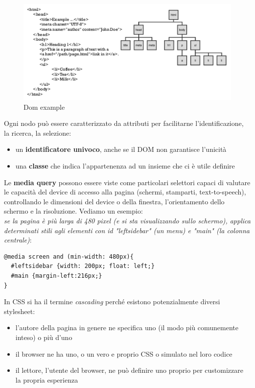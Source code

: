 \documentclass[a4paper,12pt, oneside]{book}
\begin{document}
\begin{figure}
    \caption{Dom example}
    \label{dom:example}
	\includegraphics[scale=0.9]{img/dom.png}
\end{figure}
Ogni nodo può essere caratterizzato da attributi per facilitarne l'identificazione, la ricerca, la selezione:
\begin{itemize}
	\item un \textbf{identificatore univoco}, anche se il DOM non garantisce l'unicità
	\item una \textbf{classe} che indica l'appartenenza ad un insieme che ci è utile definire
\end{itemize}
Le \textbf{media query} possono essere viste come particolari selettori capaci di valutare le capacità
del device di accesso alla pagina (schermi, stamparti, text-to-speech), controllando le dimensioni
del device o della finestra, l'orientamento dello schermo e la risoluzione.
Vediamo un esempio:\\
\textit{se la pagina è più larga di 480
	pixel (e si sta visualizzando sullo schermo), applica
	determinati stili agli elementi con id "leftsidebar" (un menu) e "main" (la colonna centrale)}:
\begin{verbatim}
@media screen and (min-width: 480px){
  #leftsidebar {width: 200px; float: left;}
  #main {margin-left:216px;}
}
\end{verbatim}
In CSS si ha il termine \textit{cascading} perché esistono potenzialmente diversi stylesheet:
\begin{itemize}
	\item l'autore della pagina in genere ne specifica uno (il modo più comunemente inteso) o più d'uno
	\item il browser ne ha uno, o un vero e proprio CSS o simulato nel loro codice
	\item il lettore, l’utente del browser, ne può definire uno proprio per customizzare la propria esperienza
\end{itemize}
\end{document}
